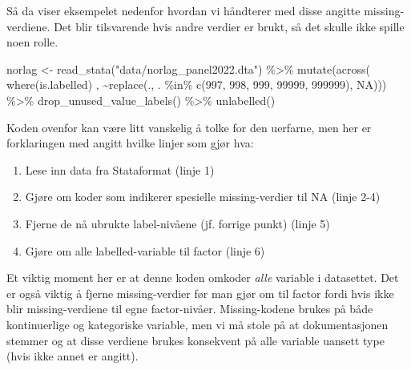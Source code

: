 \documentclass[
  letterpaper,
  DIV=11,
  numbers=noendperiod]{scrreprt}
\newenvironment{Shaded}{\begin{snugshade}}{\end{snugshade}}
\newcommand{\ConstantTok}[1]{\textcolor[rgb]{0.56,0.35,0.01}{#1}}
\newcommand{\DecValTok}[1]{\textcolor[rgb]{0.68,0.00,0.00}{#1}}
\newcommand{\FunctionTok}[1]{\textcolor[rgb]{0.28,0.35,0.67}{#1}}
\newcommand{\NormalTok}[1]{\textcolor[rgb]{0.00,0.23,0.31}{#1}}
\newcommand{\OtherTok}[1]{\textcolor[rgb]{0.00,0.23,0.31}{#1}}
\newcommand{\SpecialCharTok}[1]{\textcolor[rgb]{0.37,0.37,0.37}{#1}}
\newcommand{\StringTok}[1]{\textcolor[rgb]{0.13,0.47,0.30}{#1}}
\providecommand{\tightlist}{%
  \setlength{\itemsep}{0pt}\setlength{\parskip}{0pt}}\usepackage{longtable,booktabs,array}
\begin{document}
Så da viser eksempelet nedenfor hvordan vi håndterer med disse angitte
missing-verdiene. Det blir tilsvarende hvis andre verdier er brukt, så
det skulle ikke spille noen rolle.

\begin{Shaded}
\begin{Highlighting}[]
\NormalTok{norlag }\OtherTok{\textless{}{-}} \FunctionTok{read\_stata}\NormalTok{(}\StringTok{"data/norlag\_panel2022.dta"}\NormalTok{) }\SpecialCharTok{\%\textgreater{}\%} 
    \FunctionTok{mutate}\NormalTok{(}\FunctionTok{across}\NormalTok{( }\FunctionTok{where}\NormalTok{(is.labelled) ,  }\SpecialCharTok{\textasciitilde{}}\FunctionTok{replace}\NormalTok{(., }
\NormalTok{                                        . }\SpecialCharTok{\%in\%} \FunctionTok{c}\NormalTok{(}\DecValTok{997}\NormalTok{, }\DecValTok{998}\NormalTok{, }\DecValTok{999}\NormalTok{, }\DecValTok{99999}\NormalTok{, }\DecValTok{999999}\NormalTok{), }
                                        \ConstantTok{NA}\NormalTok{))) }\SpecialCharTok{\%\textgreater{}\%}
  \FunctionTok{drop\_unused\_value\_labels}\NormalTok{() }\SpecialCharTok{\%\textgreater{}\%} 
  \FunctionTok{unlabelled}\NormalTok{()}
\end{Highlighting}
\end{Shaded}

Koden ovenfor kan være litt vanskelig å tolke for den uerfarne, men her
er forklaringen med angitt hvilke linjer som gjør hva:

\begin{enumerate}
\def\labelenumi{\arabic{enumi})}
\tightlist
\item
  Lese inn data fra Stataformat (linje 1)
\item
  Gjøre om koder som indikerer spesielle missing-verdier til NA (linje
  2-4)
\item
  Fjerne de nå ubrukte label-nivåene (jf. forrige punkt) (linje 5)
\item
  Gjøre om alle labelled-variable til factor (linje 6)
\end{enumerate}

Et viktig moment her er at denne koden omkoder \emph{alle} variable i
datasettet. Det er også viktig å fjerne missing-verdier før man gjør om
til factor fordi hvis ikke blir missing-verdiene til egne factor-nivåer.
Missing-kodene brukes på både kontinuerlige og kategoriske variable, men
vi må stole på at dokumentasjonen stemmer og at disse verdiene brukes
konsekvent på alle variable uansett type (hvis ikke annet er angitt).
\end{document}
